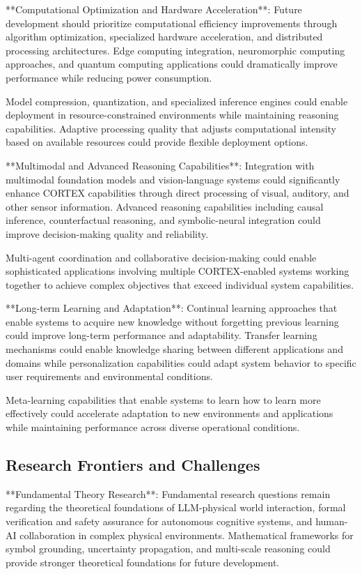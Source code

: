 **Computational Optimization and Hardware Acceleration**:
Future development should prioritize computational efficiency improvements through algorithm optimization, specialized hardware acceleration, and distributed processing architectures. Edge computing integration, neuromorphic computing approaches, and quantum computing applications could dramatically improve performance while reducing power consumption.

Model compression, quantization, and specialized inference engines could enable deployment in resource-constrained environments while maintaining reasoning capabilities. Adaptive processing quality that adjusts computational intensity based on available resources could provide flexible deployment options.

**Multimodal and Advanced Reasoning Capabilities**:
Integration with multimodal foundation models and vision-language systems could significantly enhance CORTEX capabilities through direct processing of visual, auditory, and other sensor information. Advanced reasoning capabilities including causal inference, counterfactual reasoning, and symbolic-neural integration could improve decision-making quality and reliability.

Multi-agent coordination and collaborative decision-making could enable sophisticated applications involving multiple CORTEX-enabled systems working together to achieve complex objectives that exceed individual system capabilities.

**Long-term Learning and Adaptation**:
Continual learning approaches that enable systems to acquire new knowledge without forgetting previous learning could improve long-term performance and adaptability. Transfer learning mechanisms could enable knowledge sharing between different applications and domains while personalization capabilities could adapt system behavior to specific user requirements and environmental conditions.

Meta-learning capabilities that enable systems to learn how to learn more effectively could accelerate adaptation to new environments and applications while maintaining performance across diverse operational conditions.

\subsection{Research Frontiers and Challenges}

**Fundamental Theory Research**:
Fundamental research questions remain regarding the theoretical foundations of LLM-physical world interaction, formal verification and safety assurance for autonomous cognitive systems, and human-AI collaboration in complex physical environments. Mathematical frameworks for symbol grounding, uncertainty propagation, and multi-scale reasoning could provide stronger theoretical foundations for future development.

